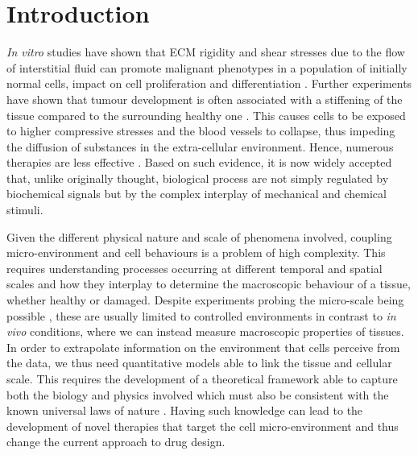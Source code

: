\section{Introduction}

\textit{In vitro} studies have shown that ECM rigidity and shear stresses due to the flow of interstitial fluid can promote malignant phenotypes in a population of initially normal cells, impact on cell proliferation and differentiation \cite{ex3}. Further experiments have shown that tumour development is often associated with a stiffening of the tissue compared to the surrounding healthy one \cite{ex4}. This causes cells to be exposed to higher compressive stresses and the blood vessels to collapse, thus impeding the diffusion of substances in the extra-cellular environment. Hence, numerous therapies are less effective \cite{ecm2}. Based on such evidence, it is now widely accepted that, unlike originally thought, biological process are not simply regulated by biochemical signals but by the complex interplay of mechanical and chemical stimuli.
 
Given the different physical nature and scale of phenomena involved, coupling micro-environment and cell behaviours is a problem of high complexity. This requires understanding processes occurring at different temporal and spatial scales and how they interplay to determine the macroscopic behaviour of a tissue, whether healthy or damaged. Despite experiments probing the micro-scale being possible \cite{viscoporo,afmtest}, these are usually limited to controlled environments in contrast to \textit{in vivo} conditions, where we can instead measure macroscopic properties of tissues. In order to extrapolate information on the environment that cells perceive from the data, we thus need quantitative models able to link the tissue and cellular scale. This requires the development of a theoretical framework able to capture both the biology and physics involved which must also be consistent with the known universal laws of nature \cite{NET}. Having such knowledge can lead to the development of novel therapies that target the cell micro-environment and thus change the current approach to drug design.  

